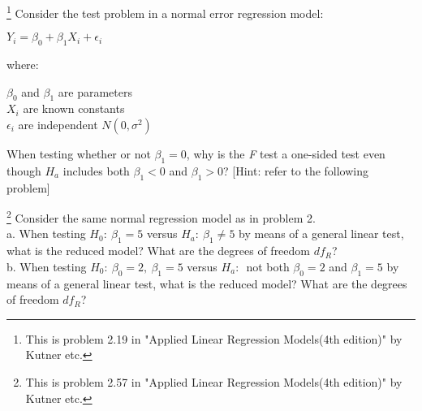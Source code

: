 \documentclass[12pt]{article}
\begin{document}
 {\footnote[2]{This is
problem 2.19 in "Applied Linear Regression Models(4th edition)" by
Kutner etc.} 
 Consider the test problem in a normal error regression model:
 \begin{center}
 $Y_i=\beta_0+\beta_1 X_i+\epsilon_i$\\
 \end{center}
 where:\\
 \begin{center}
 $\beta_0$ and $\beta_1$ are parameters\\
 $X_i$ are known constants\\
 $\epsilon_i$ are independent $N(0,\sigma^2)$
 \end{center}
 When testing whether or not $\beta_1=0$, why is the \textit{F} test a one-sided test even though $H_a$ includes both $\beta_1<0$ and $\beta_1>0$? [Hint: refer to the following problem]
   }
 { \vfill
  \answer
} { }

 {\footnote[3]{This is
problem 2.57 in "Applied Linear Regression Models(4th edition)" by
Kutner etc.} 
 Consider the same normal regression model as in problem 2.\\
 a. When testing $H_0:~\beta_1=5$ versus $H_a:~\beta_1\ne 5$ by means of a general linear test, what is the reduced model? What are the degrees of freedom $df_R$?\\
 b. When testing $H_0:~ \beta_0=2,~\beta_1=5$ versus $H_a:$~not both $\beta_0=2$ and $\beta_1=5$ by means of a general linear test, what is the reduced model? What are the degrees of freedom $df_R$? 
}
 { \vfill
  \answer
} {}




\problemsdone
\end{document}
